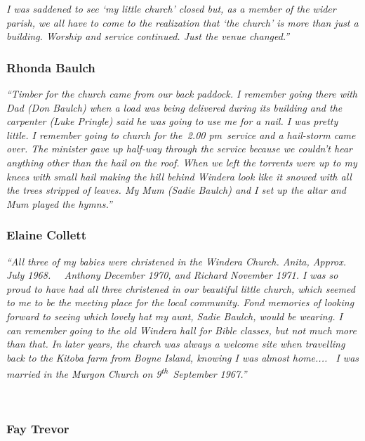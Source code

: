 \emph{I was saddened to see `my little church' closed but, as a member of the wider parish, we all have to come to the realization that `the church' is more than just a building. Worship and service continued. Just the venue changed.''}

\hypertarget{rhonda-baulch}{%
\subsubsection{Rhonda Baulch}\label{rhonda-baulch}}

\emph{``Timber for the church came from our back paddock. I remember going there with Dad (Don Baulch) when a load was being delivered during its building and the carpenter (Luke Pringle) said he was going to use me for a nail. I was pretty little. I remember going to church for the~2.00 pm~service and a hail-storm came over. The minister gave up half-way through the service because we couldn't hear anything other than the hail on the roof. When we left the torrents were up to my knees with small hail making the hill behind Windera look like it snowed with all the trees stripped of leaves. My Mum (Sadie Baulch) and I set up the altar and Mum played the hymns.''}

\hypertarget{elaine-collett}{%
\subsubsection{Elaine Collett}\label{elaine-collett}}

\emph{``All three of my babies were christened in the Windera Church. Anita, Approx. July 1968.~~ Anthony December 1970, and Richard November 1971. I was so proud to have had all three christened in our beautiful little church, which seemed to me to be the meeting place for the local community. Fond memories of looking forward to seeing which lovely hat my aunt, Sadie Baulch, would be wearing. I can remember going to the old Windera hall for Bible classes, but not much more than that. In later years, the church was always a welcome site when travelling back to the Kitoba farm from Boyne Island, knowing I was almost home.... ~I was married in the Murgon Church on 9\textsuperscript{th}~September 1967.''}

~

\hypertarget{fay-trevor}{%
\subsubsection{Fay Trevor}\label{fay-trevor}}

